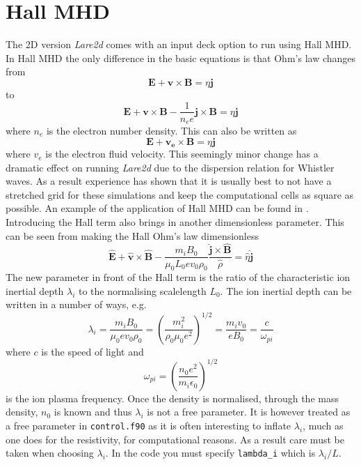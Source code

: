\documentclass[11pt]{article}
\begin{document}
\section{Hall MHD}
The 2D version {\it Lare2d} comes with an input deck option to run using Hall MHD. In Hall MHD the only difference in the basic equations is that Ohm's law changes from
\begin{displaymath}
\mathbf{E}+\mathbf{v}\times\mathbf{B}=\eta \mathbf{j}
\end{displaymath}
to
\begin{displaymath}
\mathbf{E}+\mathbf{v}\times\mathbf{B}-\frac{1}{n_e e}\mathbf{j}\times\mathbf{B}=\eta \mathbf{j}
\end{displaymath}
where $n_e$ is the electron number density. This can also be written as
\begin{displaymath}
\mathbf{E}+\mathbf{v_e}\times\mathbf{B}=\eta \mathbf{j}
\end{displaymath}
where $v_e$ is the electron fluid velocity. This seemingly minor change has a dramatic effect on running {\it Lare2d} due to the dispersion relation for Whistler waves. As a result experience has shown that it is usually best to not have a stretched grid for these simulations and keep the computational cells as square as possible. An example of the application of Hall MHD can be found in \cite{hall}. Introducing the Hall term also brings in another dimensionless parameter. This can be seen from making the Hall Ohm's law dimensionless
\begin{displaymath}
\hat{\mathbf{E}}+\hat{\mathbf{v}}\times\hat{\mathbf{B}}-\frac{m_iB_0}{\mu_0 L_0 e v_0 \rho_0} \frac{\hat{\mathbf{j}}\times\hat{\mathbf{B}}}{\hat{\rho}}=\hat{\eta} \hat{\mathbf{j}}
\end{displaymath}
The new parameter in front of the Hall term is the ratio of the characteristic ion inertial depth $\lambda_i$ to the normalising scalelength $L_0$. The ion inertial depth can be written in a number of ways, e.g.
\begin{displaymath}
\lambda_i=\frac{m_i B_0}{\mu_0 e v_0 \rho_0} =\left(\frac{m_i^2}{\rho_0\mu_0e^2}\right)^{1/2}=\frac{m_i v_0}{e B_0}=\frac{c}{\omega_{pi} }
\end{displaymath}
where $c$ is the speed of light and
\begin{displaymath}
\omega_{pi}=\left(\frac{n_0 e^2}{m_i \epsilon_0}\right)^{1/2}
\end{displaymath}
is the ion plasma frequency. Once the density is normalised, through the mass density, $n_0$ is known and thus $\lambda_i$ is not a free parameter. It is however treated as a free parameter in \texttt{control.f90} as it is often interesting to inflate $\lambda_i$, much as one does for the resistivity, for computational reasons. As a result care must be taken when choosing $\lambda_i$. In the code you must specify {\tt lambda\_i} which is $\lambda_i/L$.
\end{document}
